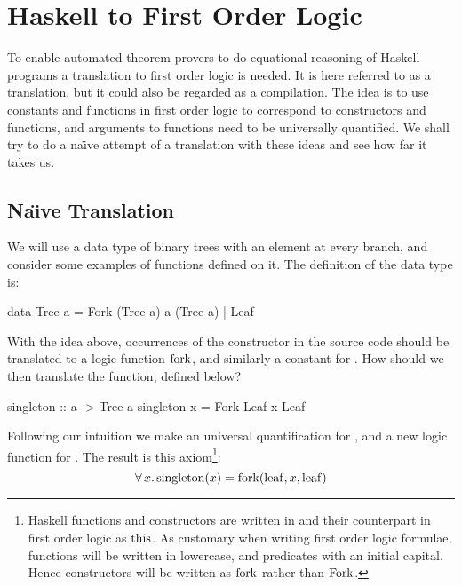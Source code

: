 \chapter{Haskell to First Order Logic}
\label{ch:translation}

To enable automated theorem provers to do equational reasoning of
Haskell programs a translation to first order logic is needed. It is
here referred to as a translation, but it could also be regarded as a
compilation. The idea is to use constants and functions in first order
logic to correspond to constructors and functions, and arguments to
functions need to be universally quantified. We shall try to do a
na\"{\i}ve attempt of a translation with these ideas and see how far it
takes us.

\section{Na\"{\i}ve Translation}
\label{sec:treetrans}

We will use a data type of binary trees with an element at every
branch, and consider some examples of functions defined on it. The
definition of the data type is:

\begin{code}
data Tree a = Fork (Tree a) a (Tree a) | Leaf
\end{code}

\noindent
With the idea above, occurrences of the  constructor in the
source code should be translated to a logic function $\mathrm{fork}$, and
similarly a constant for . How should we then translate the
 function, defined below?

\begin{code}
singleton :: a -> Tree a
singleton x = Fork Leaf x Leaf
\end{code}

\noindent
Following our intuition we make an universal quantification for
, and a new logic function for . The result is
this axiom\footnote{Haskell functions and constructors are written in
   and their counterpart in first order logic as
  $\mathrm{this}$. As customary when writing first order logic formulae,
  functions will be written in lowercase, and predicates with an
  initial capital. Hence constructors will be written as $\mathrm{fork}$
  rather than $\mathrm{Fork}$. }:
\begin{equation*}
\forall \, x . \, \mathrm{singleton}(x) = \mathrm{fork}(\mathrm{leaf},x,\mathrm{leaf})
\end{equation*}

